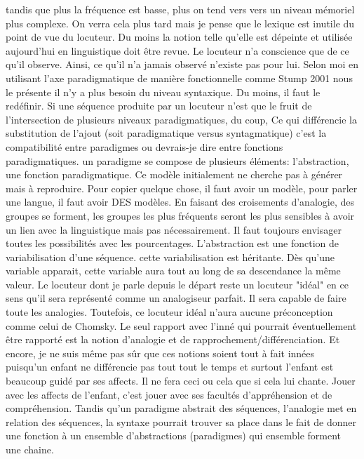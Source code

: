 \documentclass[a4paper,11pt]{article}
\begin{document}
tandis que plus la fréquence est basse, plus on tend vers vers un niveau mémoriel plus complexe. On verra cela plus tard mais je pense que le lexique est inutile du point de vue du locuteur. Du moins la notion telle qu'elle
est dépeinte et utilisée aujourd'hui en linguistique doit être revue.
Le locuteur n'a conscience que de ce qu'il observe. Ainsi, ce qu'il n'a jamais observé n'existe pas pour lui. Selon moi en utilisant l'axe paradigmatique de manière fonctionnelle comme Stump 2001 nous le présente
il n'y a plus besoin du niveau syntaxique. Du moins, il faut le redéfinir. Si une séquence produite par un locuteur n'est que le fruit de l'intersection de plusieurs niveaux paradigmatiques, du coup, Ce qui différencie
la substitution de l'ajout (soit paradigmatique versus syntagmatique) c'est la compatibilité entre paradigmes ou devrais-je dire entre fonctions paradigmatiques. 
un paradigme se compose de plusieurs éléments: l'abstraction, une fonction paradigmatique. 
Ce modèle initialement ne cherche pas à générer mais à reproduire. Pour copier quelque chose, il faut avoir un modèle, pour parler une langue, il faut avoir DES modèles. En faisant des croisements d'analogie,
des groupes se forment, les groupes les plus fréquents seront les plus sensibles à avoir un lien avec la linguistique mais pas nécessairement. Il faut toujours envisager toutes les possibilités avec les pourcentages.
L'abstraction est une fonction de variabilisation d'une séquence. cette variabilisation est héritante. Dès qu'une variable apparait, cette variable aura tout au long de sa descendance la même valeur.
Le locuteur dont je parle depuis le départ reste un locuteur "idéal" en ce sens qu'il sera représenté comme un analogiseur parfait. Il sera capable de faire toute les analogies. Toutefois, ce locuteur idéal n'aura aucune préconception
comme celui de Chomsky. Le seul rapport avec l'inné qui pourrait éventuellement être rapporté est la notion d'analogie et de rapprochement/différenciation. Et encore, je ne suis même pas sûr
que ces notions soient tout à fait innées puisqu'un enfant ne différencie pas tout tout le temps et surtout l'enfant est beaucoup guidé par ses affects. Il ne fera ceci ou cela que si cela lui chante. Jouer avec les affects de l'enfant, c'est jouer avec
ses facultés d'appréhension et de compréhension.
Tandis qu'un paradigme abstrait des séquences, l'analogie met en relation des séquences, la syntaxe pourrait trouver sa place dans le fait de donner une fonction à un ensemble d'abstractions (paradigmes) qui ensemble forment une chaine.
\end{document}
